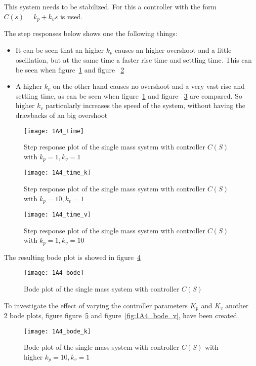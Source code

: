 \documentclass[report.tex]{subfiles}
\begin{document}
This system needs to be stabilized. For this a controller with the form $C(s) = k_p + k_v s$ is used.

The step responses below shows one the following things: 
\begin{itemize}
\item{It can be seen that an higher $k_p$ causes an higher overshoot and a little oscillation, but at the same time a faster rise time and settling time. This can be seen when figure~\ref{fig:1A4_time} and figure ~\ref{fig:1A4_time_k}}
\item{A higher $k_v$ on the other hand causes no overshoot and a very vast rise and settling time, as can be seen when figure~\ref{fig:1A4_time} and figure ~\ref{fig:1A4_time_v} are compared. So higher $k_v$ particularly increases the speed of the system, without having the drawbacks of an big overshoot} 
\end{itemize}

\begin{figure}
  \centering
\texttt{[image: 1A4\_time]}
\caption{Step response plot of the single mass system with controller $C(S)$ with  $k_p = 1, k_v = 1$}
\label{fig:1A4_time}
\end{figure}

\begin{figure}
  \centering
\texttt{[image: 1A4\_time\_k]}
\caption{Step response plot of the single mass system with controller $C(S)$ with  $k_p = 10, k_v = 1$}
\label{fig:1A4_time_k}
\end{figure}

\begin{figure}[H]
  \centering
\texttt{[image: 1A4\_time\_v]}
\caption{Step response plot of the single mass system with controller $C(S)$ with  $k_p = 1, k_v = 10$}
\label{fig:1A4_time_v}
\end{figure}

The resulting bode plot is showed in figure~\ref{fig:1A4_bode}

\begin{figure}
  \centering
    \texttt{[image: 1A4\_bode]}
 	\caption{Bode plot of the single mass system with controller $C(S)$}
  \label{fig:1A4_bode}
\end{figure}
\newpage
To investigate the effect of varying the controller parameters $K_p$ and $K_v$ another 2 bode plots, figure figure~\ref{fig:1A4_bode_k} and figure~\ref{fig:1A4_bode_v}, have been created. 
\begin{figure}
  \centering
\texttt{[image: 1A4\_bode\_k]}
\caption{Bode plot of the single mass system with controller $C(S)$ with higher $k_p = 10, k_v
 = 1$}
\label{fig:1A4_bode_k}
\end{figure}
\end{document}
